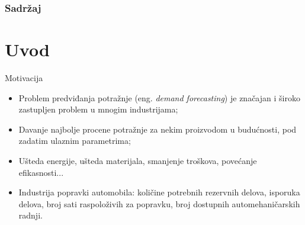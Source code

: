 \documentclass{beamer}
\begin{document}
\begin{frame}\frametitle{Sadržaj}\tableofcontents
\end{frame} 

\section{Uvod} 
\begin{frame} {Motivacija} 
\begin{itemize}
    \item Problem predviđanja potražnje (eng. \textit{demand forecasting}) je značajan i široko zastupljen problem u mnogim industrijama;
    \item Davanje najbolje procene potražnje za nekim proizvodom u budućnosti, pod zadatim ulaznim parametrima;
    \item Ušteda energije, ušteda materijala, smanjenje troškova, povećanje efikasnosti...
    \item Industrija popravki automobila: količine potrebnih rezervnih delova, isporuka delova, broj sati raspoloživih za popravku, broj dostupnih automehaničarskih radnji.
\end{itemize}

\end{frame}
\end{document}
